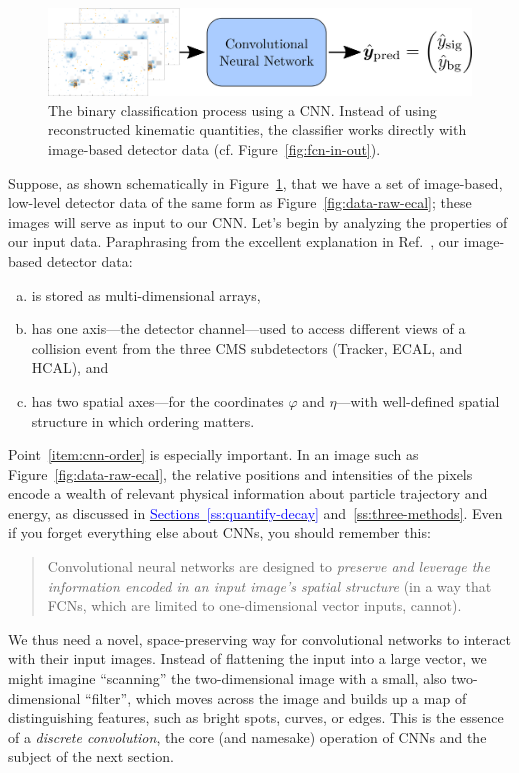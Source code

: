 \documentclass[11pt, a4paper]{article}
\newcommand{\myhref}[2]{\hyperref[#1]{\textcolor{blue}{#2}}}
\begin{document}
\begin{figure}[htb!]
    \centering
    \includegraphics[width=0.9\linewidth]{raster/raster-svg/cnn-in-out.png}
    \caption{The binary classification process using a CNN.
    Instead of using reconstructed kinematic quantities, the classifier works directly with image-based detector data (cf. Figure~\ref{fig:fcn-in-out}).}
    \label{fig:ccn-in-out}
\end{figure}

Suppose, as shown schematically in Figure~\ref{fig:ccn-in-out}, that we have a set of image-based, low-level detector data of the same form as Figure~\ref{fig:data-raw-ecal}; these images will serve as input to our CNN.
Let's begin by analyzing the properties of our input data.
Paraphrasing from the excellent explanation in Ref.~\cite{cnn-guide}, our image-based detector data:
\begin{enumerate}[(a)]

    \item is stored as multi-dimensional arrays,

    \item has one axis---the detector channel---used to access different views of a collision event from the three CMS subdetectors (Tracker, ECAL, and HCAL), and %

    \item \label{item:cnn-order} has two spatial axes---for the coordinates $ \varphi $ and $ \eta $---with well-defined spatial structure in which ordering matters.

\end{enumerate}
Point~\ref{item:cnn-order} is especially important.
In an image such as Figure~\ref{fig:data-raw-ecal}, the relative positions and intensities of the pixels encode a wealth of relevant physical information about particle trajectory and energy, as discussed in \myhref{ss:quantify-decay}{Sections~\ref{ss:quantify-decay}} and~\ref{ss:three-methods}.
Even if you forget everything else about CNNs, you should remember this:
\begin{quote}
    Convolutional neural networks are designed to \textit{preserve and leverage the information encoded in an input image's spatial structure} (in a way that FCNs, which are limited to one-dimensional vector inputs, cannot).
\end{quote}
We thus need a novel, space-preserving way for convolutional networks to interact with their input images.
Instead of flattening the input into a large vector, we might imagine ``scanning'' the two-dimensional image with a small, also two-dimensional ``filter'', which moves across the image and builds up a map of distinguishing features, such as bright spots, curves, or edges.
This is the essence of a \textit{discrete convolution}, the core (and namesake) operation of CNNs and the subject of the next section.
\end{document}
